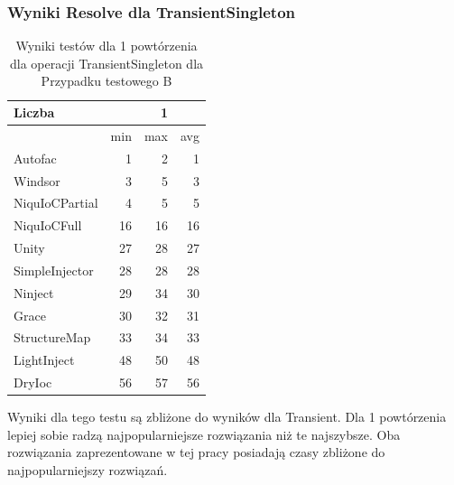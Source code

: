 \documentclass[12pt]{article}
\begin{document}
\subsubsection{Wyniki Resolve dla TransientSingleton}
\begin{table}[H]
\captionsetup{belowskip=0pt,aboveskip=0pt}
\begin{center}
\begin{small}
	\begin{tabular}{ | l | r r r | }
    		\hline
Liczba & & 1 & \\ \hline
 & min & max & avg \\ \hline
Autofac & 1 & 2 & 1 \\ \hline
Windsor & 3 & 5 & 3 \\ \hline
NiquIoCPartial & 4 & 5 & 5 \\ \hline
NiquIoCFull & 16 & 16 & 16 \\ \hline
Unity & 27 & 28 & 27 \\ \hline
SimpleInjector & 28 & 28 & 28 \\ \hline
Ninject & 29 & 34 & 30 \\ \hline
Grace & 30 & 32 & 31 \\ \hline
StructureMap & 33 & 34 & 33 \\ \hline
LightInject & 48 & 50 & 48 \\ \hline
DryIoc & 56 & 57 & 56 \\ \hline
  	\end{tabular}
\end{small}
\end{center}
\caption{Wyniki testów dla 1 powtórzenia dla operacji TransientSingleton dla Przypadku testowego B}
\label{TestCaseB_TransientSingleton1}
\end{table}
Wyniki dla tego testu są zbliżone do wyników dla Transient. Dla 1 powtórzenia lepiej sobie radzą najpopularniejsze rozwiązania niż te najszybsze. Oba rozwiązania zaprezentowane w tej pracy posiadają czasy zbliżone do najpopularniejszy rozwiązań.
\\ \\
\end{document}
